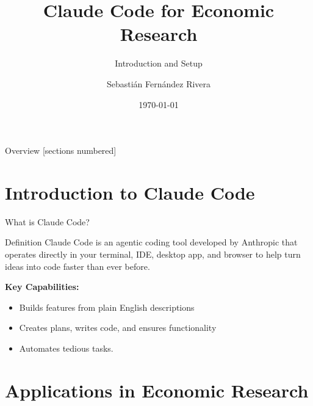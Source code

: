 \documentclass[10pt]{beamer}
\title{Claude Code for Economic Research}
\subtitle{Introduction and Setup}
\author{Sebastián Fernández Rivera}
\date{\today}
\begin{document}
	
	\maketitle
	
	\begin{frame}{Overview}
		[sections numbered]
		\tableofcontents
	\end{frame}
	
	\section{Introduction to Claude Code}
	
	\begin{frame}{What is Claude Code?}
		\begin{block}{Definition}
			Claude Code is an \alert{agentic coding tool} developed by Anthropic that operates directly in your terminal, IDE, desktop app, and browser to help turn ideas into code faster than ever before.
		\end{block}
		
		\vspace{0.5cm}
		
		\textbf{Key Capabilities:}
		\begin{itemize}
			\item Builds features from plain English descriptions
			\item Creates plans, writes code, and ensures functionality
			\item Automates tedious tasks.
		\end{itemize}
	\end{frame}
	
	\section{Applications in Economic Research}
	
\end{document}
